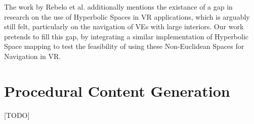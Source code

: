  The work by Rebelo et al. \cite{Rebelo2022} additionally mentions the existance of a gap in research on the use of Hyperbolic Spaces in \gls{VR} applications, which 
 is arguably still felt, particularly on the navigation of \glspl{VE} with large interiors. Our work pretends to fill this gap, by integrating a 
 similar implementation of Hyperbolic Space mapping to test the feasibility of using these Non-Euclidean Spaces for Navigation in \gls{VR}.

\section{Procedural Content Generation}
\label{sec:pcg}

[TODO]
